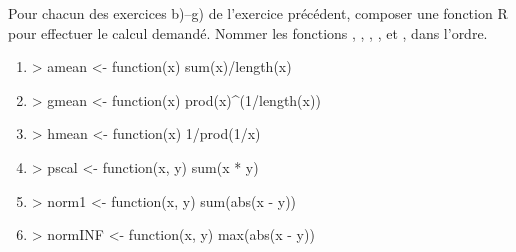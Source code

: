 \begin{exercice}
  Pour chacun des exercices b)--g) de l'exercice précédent, composer
  une fonction R pour effectuer le calcul demandé. Nommer les
  fonctions %
  , %
  , %
  , %
  , %
   et %
  , %
  dans l'ordre.
  \begin{sol}
    \begin{enumerate}
    \item
\begin{Schunk}
\begin{Sinput}
> amean <- function(x) sum(x)/length(x)
\end{Sinput}
\end{Schunk}
    \item
\begin{Schunk}
\begin{Sinput}
> gmean <- function(x) prod(x)^(1/length(x))
\end{Sinput}
\end{Schunk}
    \item
\begin{Schunk}
\begin{Sinput}
> hmean <- function(x) 1/prod(1/x)
\end{Sinput}
\end{Schunk}
    \item
\begin{Schunk}
\begin{Sinput}
> pscal <- function(x, y) sum(x * y)
\end{Sinput}
\end{Schunk}
    \item
\begin{Schunk}
\begin{Sinput}
> norm1 <- function(x, y) sum(abs(x - y))
\end{Sinput}
\end{Schunk}
    \item
\begin{Schunk}
\begin{Sinput}
> normINF <- function(x, y) max(abs(x - y))
\end{Sinput}
\end{Schunk}
    \end{enumerate}
  \end{sol}
\end{exercice}

